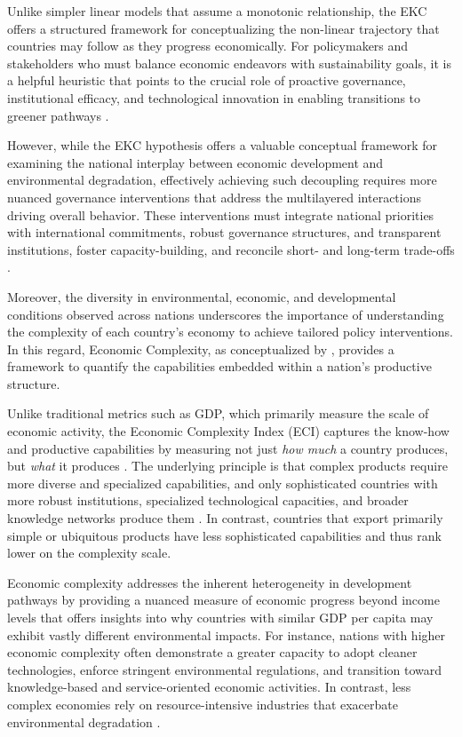 \documentclass[10pt]{article}
\begin{document}
Unlike simpler linear models that assume a monotonic relationship, the EKC offers a structured framework for conceptualizing the non-linear trajectory that countries may follow as they progress economically. For policymakers and stakeholders who must balance economic endeavors with sustainability goals, it is a helpful heuristic that points to the crucial role of proactive governance, institutional efficacy, and technological innovation in enabling transitions to greener pathways  \citep{hussainCurvatureTurningPoint2023, EKCpolicy}.

However, while the EKC hypothesis offers a valuable conceptual framework for examining the national interplay between economic development and environmental degradation, effectively achieving such decoupling requires more nuanced governance interventions that address the multilayered interactions driving overall behavior. These interventions must integrate national priorities with international commitments, robust governance structures, and transparent institutions, foster capacity-building, and reconcile short- and long-term trade-offs \citep{katramizAccelerating2030Agenda2021}.

Moreover, the diversity in environmental, economic, and developmental conditions observed across nations underscores the importance of understanding the complexity of each country's economy to achieve tailored policy interventions. In this regard, Economic Complexity, as conceptualized by \cite{hidalgoBuildingBlocksEconomic2009}, provides a framework to quantify the capabilities embedded within a nation's productive structure.

Unlike traditional metrics such as GDP, which primarily measure the scale of economic activity, the Economic Complexity Index (ECI) captures the know-how and productive capabilities by measuring not just \textit{how much} a country produces, but \textit{what} it produces \citep{hidalgoBuildingBlocksEconomic2009}. The underlying principle is that complex products require more diverse and specialized capabilities, and only sophisticated countries with more robust institutions, specialized technological capacities, and broader knowledge networks produce them \citep{hidalgoProductSpaceConditions2007}. In contrast, countries that export primarily simple or ubiquitous products have less sophisticated capabilities and thus rank lower on the complexity scale.

Economic complexity addresses the inherent heterogeneity in development pathways by providing a nuanced measure of economic progress beyond income levels that offers insights into why countries with similar GDP per capita may exhibit vastly different environmental impacts. For instance, nations with higher economic complexity often demonstrate a greater capacity to adopt cleaner technologies, enforce stringent environmental regulations, and transition toward knowledge-based and service-oriented economic activities. In contrast, less complex economies rely on resource-intensive industries that exacerbate environmental degradation \citep{doganDoesEconomicComplexity2019}. 
\end{document}
